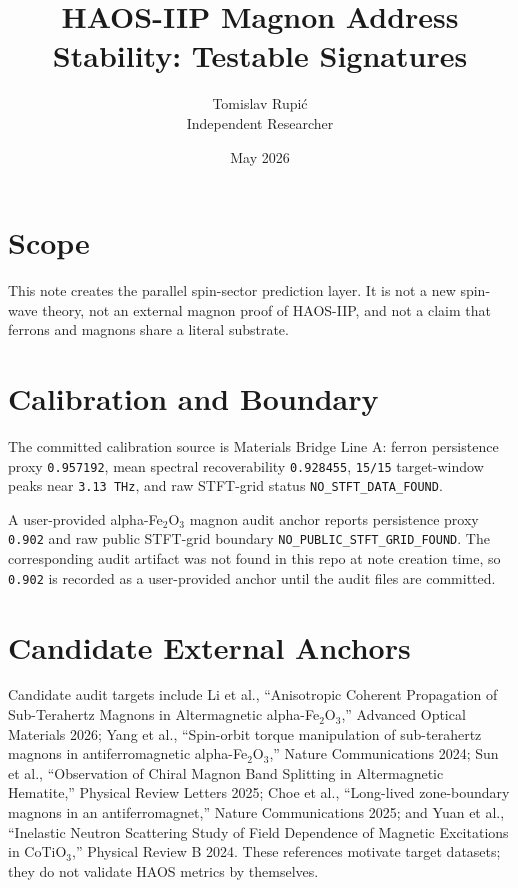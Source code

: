 \documentclass[11pt]{article}
\title{HAOS-IIP Magnon Address Stability: Testable Signatures}
\author{Tomislav Rupi\'c \\ Independent Researcher}
\date{May 2026}
\begin{document}
\maketitle

\section*{Scope}

This note creates the parallel spin-sector prediction layer. It is not a new
spin-wave theory, not an external magnon proof of HAOS-IIP, and not a claim
that ferrons and magnons share a literal substrate.

\section*{Calibration and Boundary}

The committed calibration source is Materials Bridge Line A: ferron persistence
proxy \texttt{0.957192}, mean spectral recoverability \texttt{0.928455},
\texttt{15/15} target-window peaks near \texttt{3.13 THz}, and raw STFT-grid
status \texttt{NO\_STFT\_DATA\_FOUND}.

A user-provided alpha-Fe$_2$O$_3$ magnon audit anchor reports persistence proxy
\texttt{0.902} and raw public STFT-grid boundary
\texttt{NO\_PUBLIC\_STFT\_GRID\_FOUND}. The corresponding audit artifact was not
found in this repo at note creation time, so \texttt{0.902} is recorded as a
user-provided anchor until the audit files are committed.

\section*{Candidate External Anchors}

Candidate audit targets include Li et al., ``Anisotropic Coherent Propagation of
Sub-Terahertz Magnons in Altermagnetic alpha-Fe$_2$O$_3$,'' Advanced Optical
Materials 2026; Yang et al., ``Spin-orbit torque manipulation of
sub-terahertz magnons in antiferromagnetic alpha-Fe$_2$O$_3$,'' Nature
Communications 2024; Sun et al., ``Observation of Chiral Magnon Band Splitting
in Altermagnetic Hematite,'' Physical Review Letters 2025; Choe et al.,
``Long-lived zone-boundary magnons in an antiferromagnet,'' Nature
Communications 2025; and Yuan et al., ``Inelastic Neutron Scattering Study of
Field Dependence of Magnetic Excitations in CoTiO$_3$,'' Physical Review B
2024. These references motivate target datasets; they do not validate HAOS
metrics by themselves.
\end{document}

